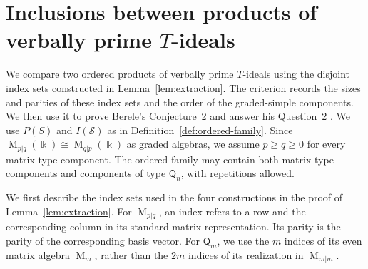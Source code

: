 \documentclass[11pt,reqno]{amsart}
\newcommand{\kk}{\Bbbk}
\newcommand{\Mat}{\operatorname{M}}
\newcommand{\Qtype}{\mathsf Q}
\theoremstyle{definition}
\theoremstyle{remark}
\numberwithin{equation}{section}
\begin{document}
\section{Inclusions between products of verbally prime
\texorpdfstring{$T$}{T}-ideals} \label{sec:capacity}

We compare two ordered products of verbally prime $T$-ideals
using the disjoint index sets constructed in
Lemma~\ref{lem:extraction}.
The criterion records the sizes and parities of these index sets
and the order of the graded-simple components. We then use it
to prove Berele's Conjecture~2 and answer his Question~2 \cite{Berele2012}.
We use $P(S)$ and $I(\mathcal S)$ as in
Definition~\ref{def:ordered-family}.
Since $\Mat_{p|q}(\kk)\cong\Mat_{q|p}(\kk)$
as graded algebras, we assume $p\geq q\geq0$
for every matrix-type component.
The ordered family may contain both matrix-type components
and components of type $\Qtype_n$, with repetitions allowed.

We first describe the index sets used in the four
constructions in the proof of Lemma~\ref{lem:extraction}.
For $\Mat_{p|q}$, an index refers to a row and the
corresponding column in its standard matrix representation.
Its parity is the parity of the corresponding basis vector.
For $\Qtype_m$, we use the $m$ indices of its even
matrix algebra $\Mat_m$, rather than the $2m$ indices
of its realization in $\Mat_{m|m}$.
\end{document}

